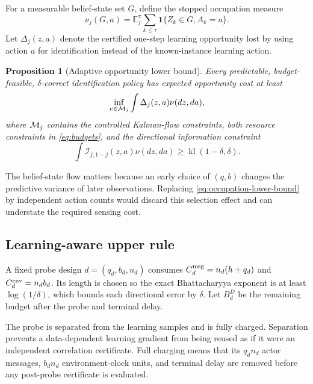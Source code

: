 \documentclass[journal]{IEEEtran}
\newtheorem{proposition}{Proposition}
\newcommand{\E}{\mathbb{E}}
\begin{document}
For a measurable belief-state set $G$, define the stopped occupation measure
\begin{equation}
\nu_j(G,a)=\E_j^\pi\sum_{k\le\tau}
\mathbf 1\{Z_k\in G,A_k=a\}.
\label{eq:occupation-measure}
\end{equation}
Let $\Delta_j(z,a)$ denote the certified one-step learning opportunity lost by using action $a$ for identification instead of the known-instance learning action.

\begin{proposition}[Adaptive opportunity lower bound]
Every predictable, budget-feasible, $\delta$-correct identification policy has expected opportunity cost at least
\begin{equation}
\inf_{\nu\in{\cal M}_j}
\int\Delta_j(z,a)\nu(dz,da),
\label{eq:occupation-lower-bound}
\end{equation}
where ${\cal M}_j$ contains the controlled Kalman-flow constraints, both resource constraints in \eqref{eq:budgets}, and the directional information constraint
\begin{equation}
\int\mathcal I_{j,1-j}(z,a)\nu(dz,da)
\ge\operatorname{kl}(1-\delta,\delta).
\label{eq:occupation-information}
\end{equation}
\label{prop:occupation}
\end{proposition}

The belief-state flow matters because an early choice of $(q,b)$ changes the predictive variance of later observations.
Replacing \eqref{eq:occupation-lower-bound} by independent action counts would discard this selection effect and can understate the required sensing cost.

\subsection{Learning-aware upper rule}
A fixed probe design $d=(q_d,b_d,n_d)$ consumes $C_d^{\rm msg}=n_d(h+q_d)$ and $C_d^{\rm env}=n_db_d$.
Its length is chosen so the exact Bhattacharyya exponent is at least $\log(1/\delta)$, which bounds each directional error by $\delta$.
Let $B_d^D$ be the remaining budget after the probe and terminal delay.

The probe is separated from the learning samples and is fully charged.
Separation prevents a data-dependent learning gradient from being reused as if it were an independent correlation certificate.
Full charging means that its $q_dn_d$ actor messages, $b_dn_d$ environment-clock units, and terminal delay are removed before any post-probe certificate is evaluated.
\end{document}
